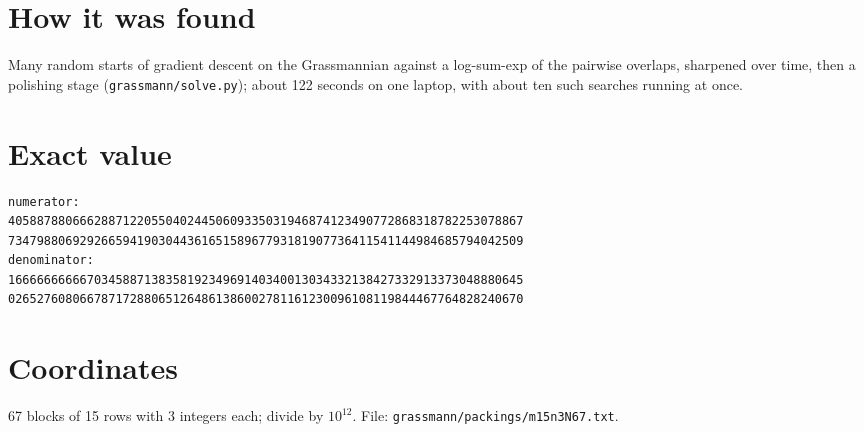\documentclass[11pt,a4paper]{article}
\begin{document}
\section{How it was found}
Many random starts of gradient descent on the Grassmannian against a log-sum-exp of the pairwise overlaps, sharpened over time, then a polishing stage (\texttt{grassmann/solve.py}); about 122 seconds on one laptop, with about ten such searches running at once.


\appendix
\section{Exact value}
{\small
\begin{verbatim}
numerator:
405887880666288712205504024450609335031946874123490772868318782253078867
734798806929266594190304436165158967793181907736411541144984685794042509
denominator:
166666666667034588713835819234969140340013034332138427332913373048880645
026527608066787172880651264861386002781161230096108119844467764828240670
\end{verbatim}}

\section{Coordinates}
67 blocks of 15 rows with 3 integers each; divide by $10^{12}$. File: \texttt{grassmann/packings/m15n3N67.txt}.
{\tiny
\begin{multicols}{3}
\end{multicols}}
\end{document}
